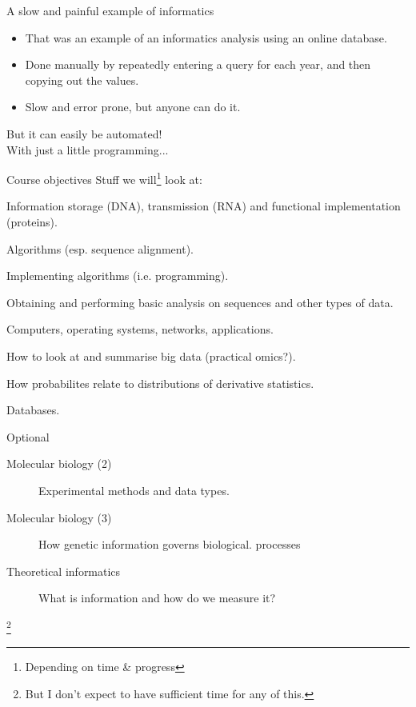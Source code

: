 \documentclass[pdf]{beamer}
\newcommand\blfootnote[1]{%
  \begingroup  %
  \renewcommand\thefootnote{}\footnote{#1}%
  \addtocounter{footnote}{-1}  %
  \endgroup
}
\begin{document}
\begin{frame}{A slow and painful example of informatics}
  \begin{itemize}
    \item That was an example of an informatics analysis using an online database.
      \pause
    \item Done manually by repeatedly entering a query for each year, and then copying out the values.
      \pause
    \item Slow and error prone, but anyone can do it.
  \end{itemize}
  \pause
  But it can easily be automated!\\
  \tiny With just a little programming...
\end{frame}

\begin{frame}{Course objectives}
  Stuff we will\footnote{Depending on time \& progress} look at:
  \footnotesize
  \begin{description}
    \item[Molecular biology] Information storage (DNA), transmission (RNA) and functional implementation (proteins).
    \item[Theoretical bioinformatics] Algorithms (esp. sequence alignment).
    \item[Practical bioinformatics] Implementing algorithms (i.e. programming).
    \item[Practical bioinformatics] Obtaining and performing basic analysis on sequences and other types of data.
    \item[Computers...] Computers, operating systems, networks, applications. 
    \item[Data visualisation] How to look at and summarise big data (practical
      omics?).
    \item[Statistics] How probabilites relate to distributions of derivative statistics.
    \item[Data organisation] Databases.
  \end{description}
\end{frame}

\begin{frame}{Optional}
  \begin{description}
    \item[Molecular biology (2)] Experimental methods and data types.
    \item[Molecular biology (3)] How genetic information governs biological.
      processes
    \item[Theoretical informatics] What is information and how do we measure it?
  \end{description}
  \blfootnote{But I don't expect to have sufficient time for any of this.}
\end{frame}
\end{document}
